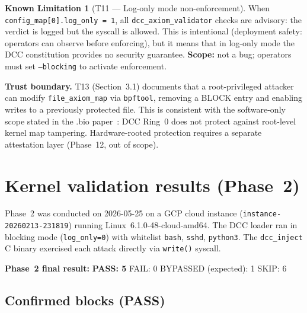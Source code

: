 \documentclass[11pt,a4paper]{article}
\theoremstyle{definition}
\newtheorem{limitation}{Known Limitation}
\begin{document}
\begin{limitation}[T11 — Log-only mode non-enforcement]
When \texttt{config\_map[0].log\_only = 1}, all \texttt{dcc\_axiom\_validator}
checks are advisory: the verdict is logged but the syscall is allowed.
This is intentional (deployment safety: operators can observe before enforcing),
but it means that in log-only mode the DCC constitution provides no security
guarantee. \textbf{Scope:} not a bug; operators must set \texttt{--blocking}
to activate enforcement.
\end{limitation}

\begin{warningbox}
\textbf{Trust boundary.} T13 (Section~3.1) documents that a root-privileged
attacker can modify \texttt{file\_axiom\_map} via \texttt{bpftool},
removing a BLOCK entry and enabling writes to a previously protected file.
This is consistent with the software-only scope stated in the
.bio paper~\cite{bioos-paper}: DCC Ring~0 does not protect against
root-level kernel map tampering. Hardware-rooted protection requires
a separate attestation layer (Phase~12, out of scope).
\end{warningbox}

\section{Kernel validation results (Phase~2)}
\label{sec:kernel}

Phase~2 was conducted on 2026-05-25 on a GCP cloud instance
(\texttt{instance-20260213-231819}) running Linux~6.1.0-48-cloud-amd64.
The DCC loader ran in blocking mode (\texttt{log\_only=0}) with whitelist
\texttt{bash}, \texttt{sshd}, \texttt{python3}. The \texttt{dcc\_inject}
C binary exercised each attack directly via \texttt{write()} syscall.

\begin{resultbox}
\textbf{Phase~2 final result:} \quad
\textbf{PASS: 5} \quad FAIL: 0 \quad BYPASSED (expected): 1 \quad SKIP: 6
\end{resultbox}

\subsection*{Confirmed blocks (PASS)}
\end{document}
